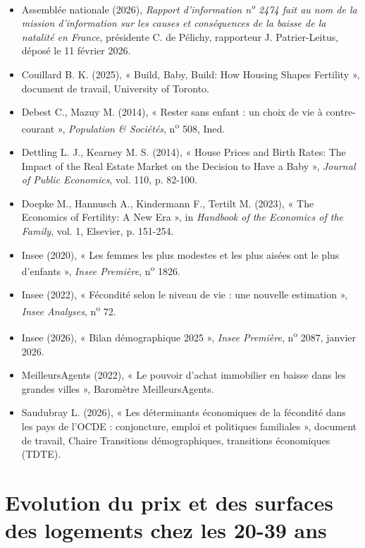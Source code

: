 \documentclass[12pt,a4paper]{article}
\begin{document}
	\begin{itemize}[leftmargin=1.2em]
		\item Assemblée nationale (2026), \textit{Rapport d’information n\textsuperscript{o} 2474 fait au nom de la mission d’information sur les causes et conséquences de la baisse de la natalité en France}, présidente C. de Pélichy, rapporteur J. Patrier-Leitus, déposé le 11 février 2026.
		\item Couillard B. K. (2025), « Build, Baby, Build: How Housing Shapes Fertility », document de travail, University of Toronto.
		\item Debest C., Mazuy M. (2014), « Rester sans enfant : un choix de vie à contre-courant », \textit{Population \& Sociétés}, n\textsuperscript{o} 508, Ined.
		\item Dettling L. J., Kearney M. S. (2014), « House Prices and Birth Rates: The Impact of the Real Estate Market on the Decision to Have a Baby », \textit{Journal of Public Economics}, vol. 110, p. 82-100.
		\item Doepke M., Hannusch A., Kindermann F., Tertilt M. (2023), « The Economics of Fertility: A New Era », in \textit{Handbook of the Economics of the Family}, vol. 1, Elsevier, p. 151-254.
		\item Insee (2020), « Les femmes les plus modestes et les plus aisées ont le plus d’enfants », \textit{Insee Première}, n\textsuperscript{o} 1826.
		\item Insee (2022), « Fécondité selon le niveau de vie : une nouvelle estimation », \textit{Insee Analyses}, n\textsuperscript{o} 72.
		\item Insee (2026), « Bilan démographique 2025 », \textit{Insee Première}, n\textsuperscript{o} 2087, janvier 2026.
		\item MeilleursAgents (2022), « Le pouvoir d’achat immobilier en baisse dans les grandes villes », Baromètre MeilleursAgents.
		\item Saudubray L. (2026), « Les déterminants économiques de la fécondité dans les pays de l’OCDE : conjoncture, emploi et politiques familiales », document de travail, Chaire Transitions démographiques, transitions économiques (TDTE).
	\end{itemize}

\newpage

	\appendix
	
	\section{Evolution du prix et des surfaces des logements chez les 20-39 ans}\label{annexe1}
	
\end{document}
